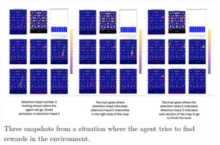 \begin{figure}[!h]
	\centering
	\includegraphics[width=\linewidth]{figures/predictive_attention}
	\caption{Three snapshots from a situation where the agent tries to find rewards in the environment.}
	\label{fig:predictiveattention}
\end{figure}

